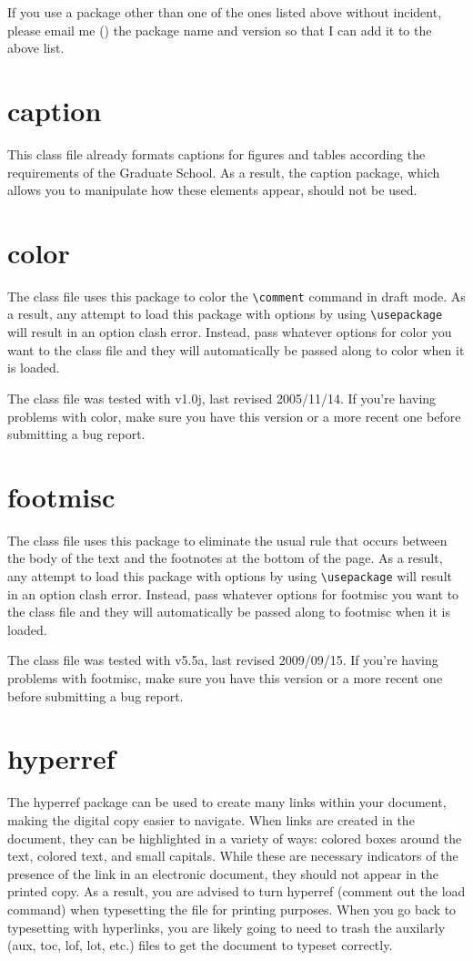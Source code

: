 If you use a package other than one of the ones listed above without incident, please email me (\email) the package name and version so that I can add it to the above list.

\section{caption}
This class file already formats captions for figures and tables according the requirements of the Graduate School.  As a result, the caption package, which allows you to manipulate how these elements appear, should not be used.

\section{color}
The class file uses this package to color the \verb=\comment= command in draft mode.  As a result, any attempt to load this package with options by using \verb=\usepackage= will result in an option clash error.  Instead, pass whatever options for color you want to the class file and they will automatically be passed along to color when it is loaded.

The class file was tested with v1.0j, last revised 2005/11/14.  If you're having problems with color, make sure you have this version or a more recent one before submitting a bug report.

\section{footmisc}
The class file uses this package to eliminate the usual rule that occurs between the body of the text and the footnotes at the bottom of the page.  As a result, any attempt to load this package with options by using \verb=\usepackage= will result in an option clash error.  Instead, pass whatever options for footmisc you want to the class file and they will automatically be passed along to footmisc when it is loaded.

The class file was tested with v5.5a, last revised 2009/09/15.  If you're having problems with footmisc, make sure you have this version or a more recent one before submitting a bug report.

\section{hyperref}
The hyperref package can be used to create many links within your document, making the digital copy easier to navigate.  When links are created in the document, they can be highlighted in a variety of ways: colored boxes around the text, colored text, and small capitals.  While these are necessary indicators of the presence of the link in an electronic document, they should not appear in the printed copy.  As a result, you are advised to turn hyperref (comment out the load command) when typesetting the file for printing purposes.  When you go back to typesetting with hyperlinks, you are likely going to need to trash the auxilarly (aux, toc, lof, lot, etc.) files to get the document to typeset correctly.

